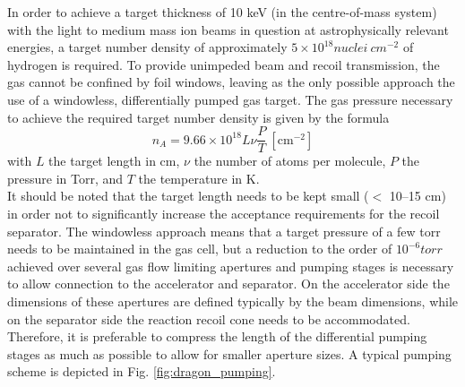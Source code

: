 In order to achieve a target thickness of 10 keV (in the centre-of-mass system) with the light to medium mass ion beams in question at astrophysically relevant energies, a target number density of approximately $5\times10^{18} \unit{nuclei~cm^{-2}}$ of hydrogen is required. To provide unimpeded beam and recoil transmission, the gas cannot be confined by foil windows, leaving as the only possible approach the use of a windowless, differentially pumped gas target. The gas pressure necessary to achieve the required target number density is given by the formula \cite{rolf88} 
\begin{equation}
n_A = 9.66\times10^{18} L \nu \frac{P}{T}~\mathrm{[cm^{-2}]}
\end{equation}
with $L$ the target length in cm, $\nu$ the number of atoms per molecule, $P$ the pressure in Torr, and $T$ the temperature in K.\\
It should be noted that the target length needs to be kept small ($<$ 10--15 cm) in order not to significantly increase the acceptance requirements for the recoil separator. The windowless approach means that a target pressure of a few torr needs to be maintained in the gas cell, but a reduction to the order of $10^{-6} \unit{torr}$ achieved over several gas flow limiting apertures and pumping stages is necessary to allow connection to the accelerator and separator. On the accelerator side the dimensions of these apertures are defined typically by the beam dimensions, while on the separator side the reaction recoil cone needs to be accommodated. Therefore, it is preferable to compress the length of the differential pumping stages as much as possible to allow for smaller aperture sizes. A typical pumping scheme is depicted in Fig. \ref{fig:dragon_pumping}.
